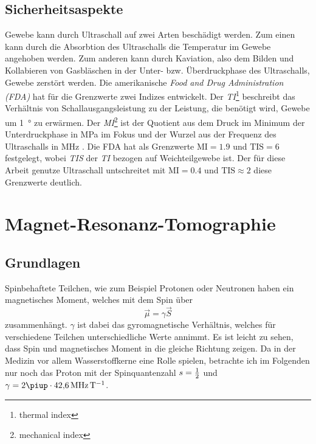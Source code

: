 \documentclass[
    11pt,
    ngerman
]{scrbook}
\begin{document}
\subsection{Sicherheitsaspekte}

Gewebe kann durch Ultraschall auf zwei Arten beschädigt werden. Zum einen kann
durch die Absorbtion des Ultraschalls die Temperatur im Gewebe angehoben
werden. Zum anderen kann durch Kaviation, also dem Bilden und Kollabieren von
Gasbläschen in der Unter- bzw. Überdruckphase des Ultraschalls, Gewebe zerstört
werden. Die amerikanische \emph{Food and Drug Administration (FDA)} hat für die
Grenzwerte zwei Indizes entwickelt. Der \emph{TI}\footnote{thermal index}
beschreibt das Verhältnis von Schallausgangsleistung zu der Leistung, die
benötigt wird, Gewebe um \SI{1}{\degree} zu erwärmen. Der
\emph{MI}\footnote{mechanical index} ist der Quotient aus dem Druck im Minimum
der Unterdruckphase in \si{\mega\pascal} im Fokus und der Wurzel aus der
Frequenz des Ultraschalls in \si{\mega\hertz}
\parencite{FDA_ultrasound_limits}. Die FDA hat als Grenzwerte
$\text{MI}=\num{1.9}$ und $\text{TIS}=6$ festgelegt, wobei \emph{TIS} der
\emph{TI} bezogen auf Weichteilgewebe ist.
Der für diese Arbeit genutze Ultraschall untschreitet mit $\text{MI}=\num{0.4}$ und $\text{TIS}\approx2$ \parencite{diss_radicke} diese Grenzwerte deutlich.

\section{Magnet-Resonanz-Tomographie}

\subsection{Grundlagen}

Spinbehaftete Teilchen, wie zum Beispiel Protonen oder Neutronen haben ein magnetisches Moment, welches mit dem Spin über
\[
    \vec\mu = \gamma\vec S
\]
zusammenhängt. $\gamma$ ist dabei das gyromagnetische Verhältnis, welches für
verschiedene Teilchen unterschiedliche Werte annimmt. Es ist leicht zu sehen,
dass Spin und magnetisches Moment in die gleiche Richtung zeigen. Da in der
Medizin vor allem Wasserstoffkerne eine Rolle spielen, betrachte ich im
Folgenden nur noch das Proton mit der Spinquantenzahl $s = \frac 12$ und $\gamma =
2\piup\cdot\SI{42.6}{\mega\hertz\per\tesla}$.
\end{document}
